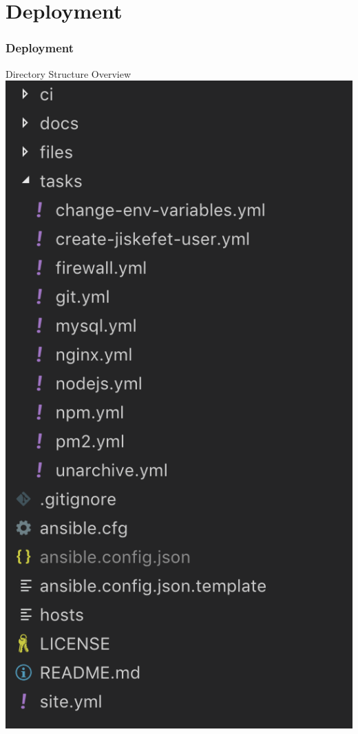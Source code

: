 \documentclass[12pt]{beamer}
\begin{document}
    \section{Deployment}
    \begin{frame}
        \frametitle{Deployment}
        Directory Structure Overview
        \newline
   		\includegraphics[scale=.38]{assets/deploy_dirstruct.png}
    \end{frame}
\end{document}
